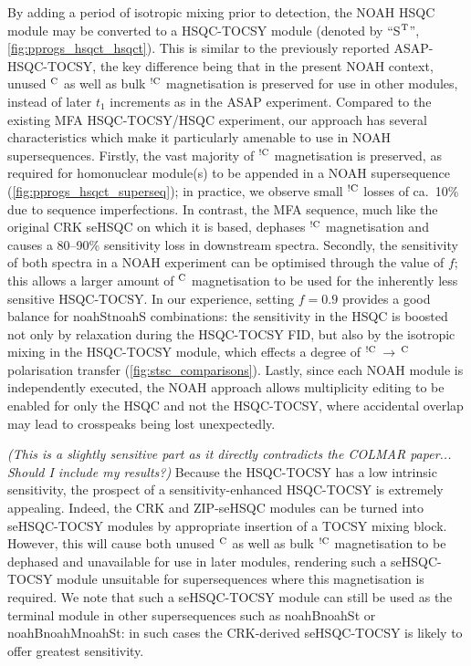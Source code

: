\documentclass[11pt]{article}
\newcommand*{\noahtwo}[2]{\csname noah#1\endcsname\csname noah#2\endcsname}
\newcommand*{\noahthree}[3]{\csname noah#1\endcsname\csname noah#2\endcsname\csname noah#3\endcsname}
\newcommand*{\noahSt}{S$\rm ^T$}
\newcommand*{\hl}[1]{\textcolor{WildStrawberry}{#1}}
\newcommand*{\magn}[1]{\ce{^1H}$^{#1}$}
\newcommand*{\magnnot}[1]{\ce{^1H}$^{!#1}$}
\begin{document}
By adding a period of isotropic mixing prior to detection, the NOAH HSQC module may be converted to a HSQC-TOCSY module (denoted by ``\noahSt{}'', \cref{fig:pprogs_hsqct_hsqct}).
This is similar to the previously reported ASAP-HSQC-TOCSY,\autocite{Becker2019JMR} the key difference being that in the present NOAH context, unused \magn{\ce{C}} as well as bulk \magnnot{\ce{C}} magnetisation is preserved for use in other modules, instead of later $t_1$ increments as in the ASAP experiment.
Compared to the existing MFA HSQC-TOCSY/HSQC experiment,\autocite{Nolis2019CPC} our approach has several characteristics which make it particularly amenable to use in NOAH supersequences.
Firstly, the vast majority of \magnnot{\ce{C}} magnetisation is preserved, as required for homonuclear module(s) to be appended in a NOAH supersequence (\cref{fig:pprogs_hsqct_superseq}); in practice, we observe small \magnnot{\ce{C}} losses of ca.\ 10\% due to sequence imperfections.
In contrast, the MFA sequence, much like the original CRK seHSQC on which it is based, dephases \magnnot{\ce{C}} magnetisation and causes a 80--90\% sensitivity loss in downstream spectra.
Secondly, the sensitivity of both spectra in a NOAH experiment can be optimised through the value of $f$; this allows a larger amount of \magn{\ce{C}} magnetisation to be used for the inherently less sensitive HSQC-TOCSY.
In our experience, setting $f = 0.9$ provides a good balance for \noahtwo{St}{S} combinations: the sensitivity in the HSQC is boosted not only by relaxation during the HSQC-TOCSY FID, but also by the isotropic mixing in the HSQC-TOCSY module, which effects a degree of \magnnot{\ce{C}}\,$\to\,$\magn{\ce{C}} polarisation transfer (\cref{fig:stsc_comparisons}).
Lastly, since each NOAH module is independently executed, the NOAH approach allows multiplicity editing to be enabled for only the HSQC and not the HSQC-TOCSY, where accidental overlap may lead to crosspeaks being lost unexpectedly.

\hl{\textit{(This is a slightly sensitive part as it directly contradicts the COLMAR paper... Should I include my results?)}
Because the HSQC-TOCSY has a low intrinsic sensitivity, the prospect of a sensitivity-enhanced HSQC-TOCSY is extremely appealing.
Indeed, the CRK and ZIP-seHSQC modules can be turned into seHSQC-TOCSY modules by appropriate insertion of a TOCSY mixing block.
However, this will cause both unused \magn{\ce{C}} as well as bulk \magnnot{\ce{C}} magnetisation to be dephased and unavailable for use in later modules, rendering such a seHSQC-TOCSY module unsuitable for supersequences where this magnetisation is required.
We note that such a seHSQC-TOCSY module can still be used as the terminal module in other supersequences such as \noahtwo{B}{St} or \noahthree{B}{M}{St}: in such cases the CRK-derived seHSQC-TOCSY is likely to offer greatest sensitivity.
}
\end{document}
